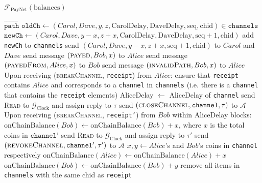 \begin{functionality}{$\mathcal{F}_{\mathrm{PayNet}}
\left(\mathrm{balances}\right)$}
\begin{algorithmic}[1]
{        $\overrightarrow{\mathtt{path}}$}
          \State $\mathtt{oldCh} \gets \left(Carol, Dave, y, z,
          \mathrm{CarolDelay}, \mathrm{DaveDelay}, \mathrm{seq},
          \mathrm{chid}\right) \in \mathtt{channels}$
          \State $\mathtt{newCh} \gets \left(Carol, Dave, y - x, z + x,
          \mathrm{CarolDelay}, \mathrm{DaveDelay}, \mathrm{seq} + 1,
          \mathrm{chid}\right)$
          \State add \texttt{newCh} to \texttt{channels}
          \State send $\left(Carol, Dave, y - x, z + x, \mathrm{seq} + 1,
          \mathrm{chid}\right)$ to $Carol$ and $Dave$ 
        \EndFor
        \State send message $\left(\textsc{payed}, Bob, x\right)$ to $Alice$
        \State send message $\left(\textsc{payedFrom}, Alice, x\right)$ to $Bob$
      \Else {}
        \State send message $\left(\textsc{invalidPath}, Bob, x\right)$ to
        $Alice$
      \EndIf
    \EndIndent
    \State
    \State Upon receiving (\textsc{breakChannel}, \texttt{receipt}) from $Alice$:
    \Indent
      \State ensure that \texttt{receipt} contains $Alice$ and corresponds to a
      \texttt{channel} in \texttt{channels} (i.e. there is a \texttt{channel}
      that contains the \texttt{receipt} elements)
      \State AliceDelay $\gets$ AliceDelay of \texttt{channel}
      \State send \textsc{Read} to $\mathcal{G}_{\mathrm{Clock}}$ and assign
      reply to $\tau$
      \State send $\left(\textsc{closeChannel}, \mathtt{channel},
      \tau\right)$ to $\mathcal{A}$
      \State Upon receiving (\textsc{breakChannel}, \texttt{receipt'}) from
      $Bob$ within AliceDelay blocks: 
        \State $\mathrm{onChainBalance}\left(Bob\right) \gets
        \mathrm{onChainBalance}\left(Bob\right) + x$, where $x$ is the total
        coins in $\texttt{channel'}$
        \State send \textsc{Read} to $\mathcal{G}_{\mathrm{Clock}}$ and assign
        reply to $\tau'$
        \State send $\left(\textsc{revokeChannel}, \mathtt{channel'},
        \tau'\right)$ to $\mathcal{A}$
      \Else
        \State $x, y \gets Alice$'s and $Bob$'s coins in \texttt{channel}
        respectively
        \State $\mathrm{onChainBalance}\left(Alice\right) \gets
        \mathrm{onChainBalance}\left(Alice\right) + x$
        \State $\mathrm{onChainBalance}\left(Bob\right) \gets
        \mathrm{onChainBalance}\left(Bob\right) + y$
      \EndIf
      \State remove all items in \texttt{channels} with the same chid as
      \texttt{receipt}
    \EndIndent
  \end{algorithmic}
\end{functionality}
